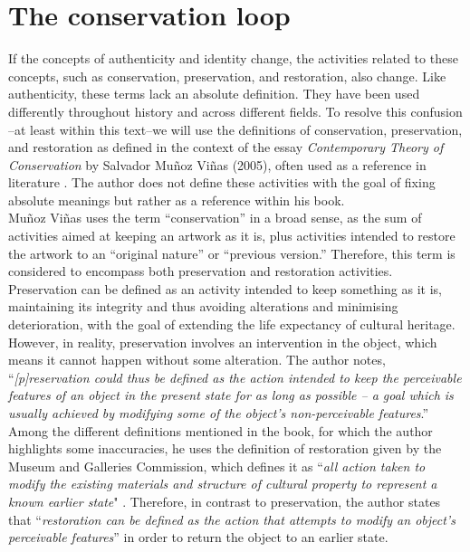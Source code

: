 \section{The conservation loop}
If the concepts of authenticity and identity change, the activities related to these concepts, such as conservation, preservation, and restoration, also change. Like authenticity, these terms lack an absolute definition. They have been used differently throughout history and across different fields. To resolve this confusion –at least within this text–we will use the definitions of conservation, preservation, and restoration as defined in the context of the essay \textit{Contemporary Theory of Conservation} by Salvador Muñoz Viñas (2005), often used as a reference in literature \cite{munoz2005contemporary}. The author does not define these activities with the goal of fixing absolute meanings but rather as a reference within his book.\\
Muñoz Viñas uses the term ``conservation'' in a broad sense, as the sum of activities aimed at keeping an artwork as it is, plus activities intended to restore the artwork to an ``original nature'' or ``previous version.'' Therefore, this term is considered to encompass both preservation and restoration activities. Preservation can be defined as an activity intended to keep something as it is, maintaining its integrity and thus avoiding alterations and minimising deterioration, with the goal of extending the life expectancy of cultural heritage. However, in reality, preservation involves an intervention in the object, which means it cannot happen without some alteration. The author notes, ``\textit{[p]reservation could thus be defined as the action intended to keep the perceivable features of an object in the present state for as long as possible – a goal which is usually achieved by modifying some of the object's non-perceivable features}.'' Among the different definitions mentioned in the book, for which the author highlights some inaccuracies, he uses the definition of restoration given by the Museum and Galleries Commission, which defines it as ``\textit{all action taken to modify the existing materials and structure of cultural property to represent a known earlier state}" \cite{mgc1994}. Therefore, in contrast to preservation, the author states that ``\textit{restoration can be defined as the action that attempts to modify an object's perceivable features}'' in order to return the object to an earlier state.\\
